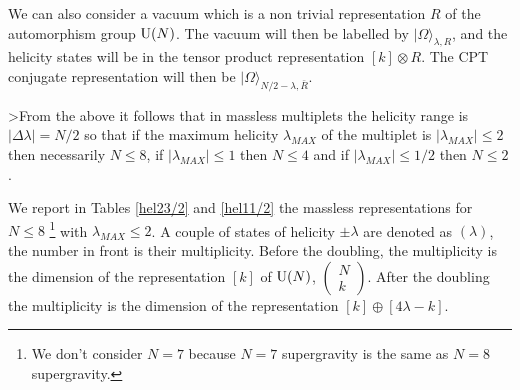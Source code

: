 \documentclass[a4paper,12pt]{article}
\begin{document}
We can also consider a vacuum which is a non trivial representation $R$ of the automorphism group $\mathrm{U}(N)$.
 The vacuum will then be labelled by $|\Omega\rangle_{\lambda,R}$, and the helicity states will be in the
  tensor product representation $[k]\otimes R$. The CPT conjugate representation will then be
  $|\Omega\rangle_{N/2-\lambda,\bar R}$.

>From the above it follows that in massless multiplets the helicity range is $|\Delta \lambda|=N/2$ so
 that if the maximum helicity $\lambda _{MAX}$ of the multiplet is $|\lambda _{MAX}|\leq 2$ then
  necessarily $N\leq 8$, if $|\lambda _{MAX}|\leq 1$ then  $N\leq 4$ and if $|\lambda _{MAX}|\leq 1/2$ then
  $N\leq 2$.

We report in Tables \ref{hel23/2} and \ref{hel11/2} the massless representations for $N\leq 8$
 \footnote{We don't consider $N=7$ because $N=7$ supergravity is the same as $N=8$ supergravity.}
  with  $\lambda_{MAX}\leq 2$.  A couple of  states of helicity $\pm\lambda$ are denoted as  $(\lambda)$,
   the number in front is their multiplicity. Before the doubling, the multiplicity is   the dimension  of
    the representation $[k]$ of $\mathrm{U}(N)$, $\begin{pmatrix}N\\k\end{pmatrix}$. After the doubling the multiplicity
    is the dimension of the representation $[k]\oplus[4\lambda-k]$.
\end{document}
